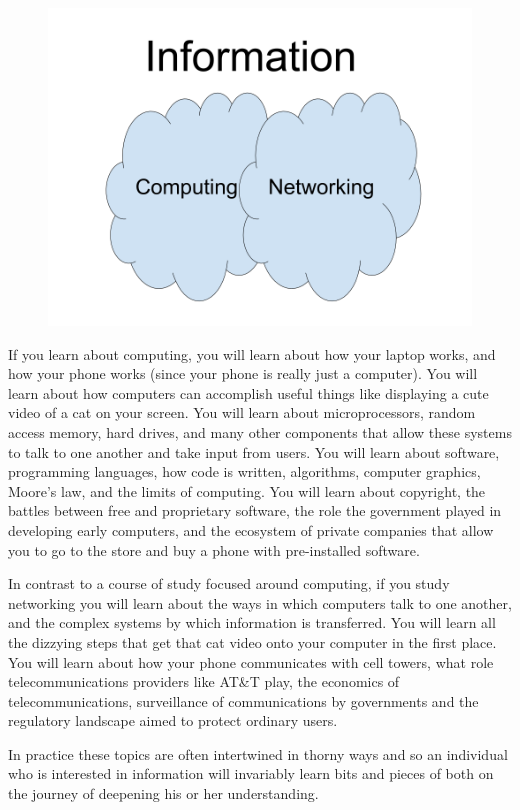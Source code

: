 \documentclass[UTF8]{book}
\begin{document}
\begin{CJK}{UTF8}{gbsn}
\begin{figure}[H]
\centering
\includegraphics[width=0.9\linewidth]{information_computing_and_networking}
\end{figure}

If you learn about computing, you will learn about how your laptop works, and how your phone works (since your phone is really just a computer). You will learn about how computers can accomplish useful things like displaying a cute video of a cat on your screen. You will learn about microprocessors, random access memory, hard drives, and many other components that allow these systems to talk to one another and take input from users. You will learn about software, programming languages, how code is written, algorithms, computer graphics, Moore's law, and the limits of computing. You will learn about copyright, the battles between free and proprietary software, the role the government played in developing early computers, and the ecosystem of private companies that allow you to go to the store and buy a phone with pre-installed software.

In contrast to a course of study focused around computing, if you study networking you will learn about the ways in which computers talk to one another, and the complex systems by which information is transferred. You will learn all the dizzying steps that get that cat video onto your computer in the first place. You will learn about how your phone communicates with cell towers, what role telecommunications providers like AT\&T play, the economics of telecommunications, surveillance of communications by governments and the regulatory landscape aimed to protect ordinary users.

In practice these topics are often intertwined in thorny ways and so an individual who is interested in information will invariably learn bits and pieces of both on the journey of deepening his or her understanding.


\end{CJK}
\end{document}

